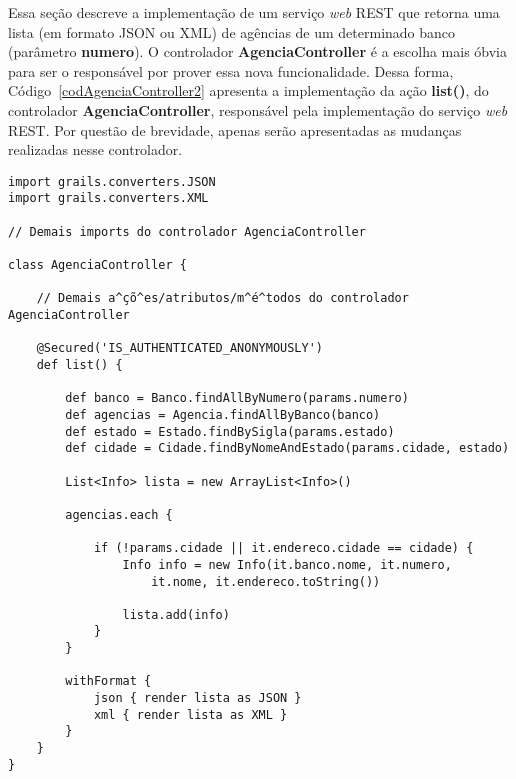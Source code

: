 \vspace{0.2cm}

\noindent Essa seção  descreve a implementação de um serviço  {\it web} REST que
retorna uma lista  (em formato JSON ou XML) de agências  de um determinado banco
(parâmetro {\bf numero}). O controlador {\bf AgenciaController} é a escolha mais
óbvia para ser o responsável  por prover essa nova funcionalidade.  Dessa forma,
Código~\ref{codAgenciaController2}  apresenta  a   implementação  da  ação  {\bf
  list()},   do   controlador    {\bf   AgenciaController},   responsável   pela
implementação do serviço {\it web}  REST. Por questão de brevidade, apenas serão
apresentadas as mudanças realizadas nesse controlador.

\vspace{0.5cm}

\begin{lstlisting}[caption=Controlador  {\bf AgenciaController},  frame  = trBL,
    float=htbp, label=codAgenciaController2] 
import grails.converters.JSON
import grails.converters.XML

// Demais imports do controlador AgenciaController

class AgenciaController { 

    // Demais a^çõ^es/atributos/m^é^todos do controlador AgenciaController
   
    @Secured('IS_AUTHENTICATED_ANONYMOUSLY')
    def list() {
        
        def banco = Banco.findAllByNumero(params.numero)
        def agencias = Agencia.findAllByBanco(banco)
        def estado = Estado.findBySigla(params.estado)
        def cidade = Cidade.findByNomeAndEstado(params.cidade, estado)
        
        List<Info> lista = new ArrayList<Info>()
        
        agencias.each {
            
            if (!params.cidade || it.endereco.cidade == cidade) {
                Info info = new Info(it.banco.nome, it.numero, 
                    it.nome, it.endereco.toString())
            
                lista.add(info)
            }
        }
            
        withFormat {
            json { render lista as JSON }
            xml { render lista as XML }
        }
    }
}
\end{lstlisting}

